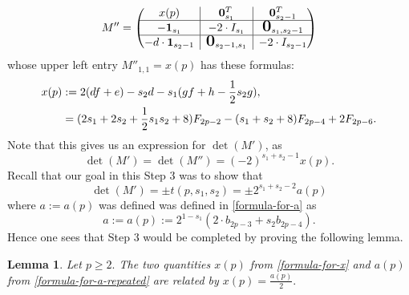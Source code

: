 \documentclass[10pt,reqno]{amsart}
\newcommand{\bigzero}{\mbox{\normalfont\Large\bfseries 0}}
\newcommand{\rvline}{\hspace*{-\arraycolsep}\vline\hspace*{-\arraycolsep}}
\def\onesvector{\mathbf{1}}
\def\zerovector{\mathbf{0}}
\newtheorem{lemma}[theorem]{Lemma}
\begin{document}
\begin{equation}
\label{block-upper-triangular-matrix}
M''=\begin{pmatrix*}
x(p) & \rvline & \zerovector^T_{s_1} & \rvline &  \zerovector^T_{s_2-1} \\
\hline
-\onesvector_{s_1} & \rvline & -2\cdot I_{s_1} & \rvline & \bigzero_{s_1,s_2-1}  \\
\hline
-d\cdot \onesvector_{s_2-1} & \rvline & \bigzero_{s_2-1,s_1} & \rvline & -2\cdot I_{s_2-1} 
\end{pmatrix*}
\end{equation}
whose upper left entry $M''_{1,1}=x(p)$ has these formulas:
\begin{align} 
\label{formula-for-x}
 \notag   x(p)&:= 2(df+e) - s_2d-s_1(gf+h-\frac{1}{2}s_2g),\\
    &= (2s_1+2s_2+\displaystyle\frac{1}{2}s_1s_2+8)F_{2p-2}-(s_1+s_2+8)F_{2p-4}+2F_{2p-6}.
\end{align}
Note that this gives us an expression for $\det(M')$, as 
$$
\det(M')=\det(M'')=(-2)^{s_1+s_2-1} x(p).
$$
Recall that our goal in this {\sf Step 3} was to show that
$$
\det(M')=\pm t(p,s_1,s_2)=\pm 2^{s_1+s_2-2} a(p)
$$
where $a:=a(p)$ was defined was defined in \eqref{formula-for-a} as
\begin{equation}
\label{formula-for-a-repeated}
a:=a(p):=2^{1-s_1}(2\cdot b_{2p-3} +s_2b_{2p-4}).
\end{equation}
Hence one sees that {\sf Step 3} would be completed by proving the following lemma.



\begin{lemma}
\label{a-is-2x}
Let $p \geq 2.$ The two quantities $x(p)$ from \eqref{formula-for-x} and $a(p)$ from \eqref{formula-for-a-repeated} are related by
$x(p) = \displaystyle\frac{a(p)}{2}.$
\end{lemma} 
\end{document}

